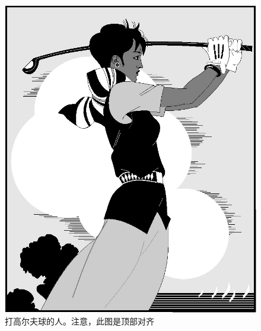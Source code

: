 \begin{figure}[htbp]
\begin{minipage}[t]{0.4\textwidth}
    \includegraphics[width=\textwidth]{golfer}
    \caption{打高尔夫球的人。注意，此图是顶部对齐}
    \label{golfer8}
  \end{minipage}
\end{figure}

